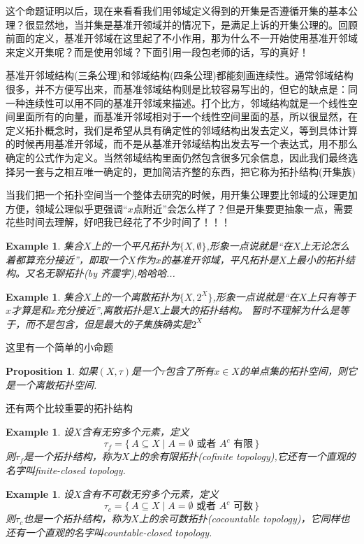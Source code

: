 \documentclass{article}
\newtheorem{proposition}[theorem]{Proposition}
\newtheorem{example}[theorem]{Example}
\newcommand\Set[2]{\{\,#1\mid#2\,\}} %
\begin{document}
这个命题证明以后，现在来看看我们用邻域定义得到的开集是否遵循开集的基本公理？很显然地，当并集是基准开领域并的情况下，是满足上诉的开集公理的。回顾前面的定义，基准开邻域在这里起了不小作用，那为什么不一开始使用基准开邻域来定义开集呢？而是使用邻域？下面引用一段包老师的话，写的真好！

基准开邻域结构(三条公理)和邻域结构(四条公理)都能刻画连续性。通常邻域结构很多，并不方便写出来，而基准邻域结构则是比较容易写出的，但它的缺点是：同一种连续性可以用不同的基准开邻域来描述。打个比方，邻域结构就是一个线性空间里面所有的向量，而基准开邻域相对于一个线性空间里面的基，所以很显然，在定义拓扑概念时，我们是希望从具有确定性的邻域结构出发去定义，等到具体计算的时候再用基准开邻域，而不是从基准开邻域结构出发去写一个表达式，用不那么确定的公式作为定义。当然邻域结构里面仍然包含很多冗余信息，因此我们最终选择另一套与之相互唯一确定的，更加简洁齐整的东西，把它称为拓扑结构(开集族)

当我们把一个拓扑空间当一个整体去研究的时候，用开集公理要比邻域的公理更加方便，领域公理似乎更强调“$x$点附近”会怎么样了？但是开集要更抽象一点，需要花些时间去理解，好吧我已经花了不少时间了！！！

\begin{example}
集合$X$上的一个平凡拓扑为$\{X,\emptyset\}$,形象一点说就是“在$X$上无论怎么着都算充分接近”，即取一个$X$作为$x$的基准开邻域，平凡拓扑是$X$上最小的拓扑结构。又名无聊拓扑(by 齐震宇),哈哈哈...
\end{example}

\begin{example}
集合$X$上的一个离散拓扑为$\{X,2^{X}\}$,形象一点说就是“在$X$上只有等于$x$才算是和$x$充分接近”,离散拓扑是$X$上最大的拓扑结构。 暂时不理解为什么是等于，而不是包含，但是最大的子集族确实是$2^{X}$
\end{example}

这里有一个简单的小命题
\begin{proposition}
如果$(X,\tau)$是一个$\tau$包含了所有$x \in X$的单点集的拓扑空间，则它是一个离散拓扑空间.
\end{proposition}

还有两个比较重要的拓扑结构

\begin{example}
设$X$含有无穷多个元素，定义\[\tau_f = \Set{A \subseteq X}{A = \emptyset \text{ 或者 } A^c \text{ 有限}}\]则$\tau_f$是一个拓扑结构，称为$X$上的余有限拓扑(cofinite topology),它还有一个直观的名字叫finite-closed topology.
\end{example}

\begin{example}
设$X$含有不可数无穷多个元素，定义\[\tau_c = \Set{A \subseteq X}{A = \emptyset \text{ 或者 } A^c \text{ 可数}}\]则$\tau_c$也是一个拓扑结构，称为$X$上的余可数拓扑(cocountable topology)，它同样也还有一个直观的名字叫countable-closed topology.
\end{example}
\end{document}

